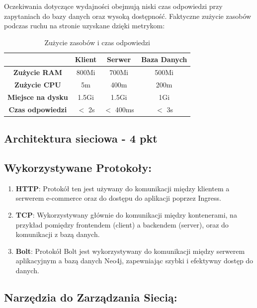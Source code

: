 \documentclass[12pt,a4paper]{article}
\begin{document}
Oczekiwania dotyczące wydajności obejmują niski czas odpowiedzi przy zapytaniach do bazy danych oraz wysoką dostępność. Faktyczne zużycie zasobów podczas ruchu na stronie uzyskane dzięki metrykom:
\begin{table}[h!]
\centering
\begin{tabular}{|c|c|c|c|}
\hline
 & \textbf{Klient} & \textbf{Serwer} & \textbf{Baza Danych} \\ \hline
\textbf{Zużycie RAM} & 800Mi & 700Mi & 500Mi \\ \hline
\textbf{Zużycie CPU} & 5m & 400m & 200m \\ \hline
\textbf{Miejsce na dysku} & 1.5Gi & 1.5Gi & 1Gi \\ \hline
\textbf{Czas odpowiedzi} & $<$ 2s & $<$ 400ms & $<$ 3s \\ \hline
\end{tabular}
\caption{Zużycie zasobów i czas odpowiedzi}
\label{table:zuzycie}
\end{table}


\subsection{Architektura sieciowa - 4 pkt}
\subsection*{Wykorzystywane Protokoły:}

\begin{enumerate}
    \item \textbf{HTTP}: Protokół ten jest używany do komunikacji między klientem a serwerem e-commerce oraz do dostępu do aplikacji poprzez Ingress.
    
    \item \textbf{TCP}: Wykorzystywany głównie do komunikacji między kontenerami, na przykład pomiędzy frontendem (client) a backendem (server), oraz do komunikacji z bazą danych.
    
    \item \textbf{Bolt}: Protokół Bolt jest wykorzystywany do komunikacji między serwerem aplikacyjnym a bazą danych Neo4j, zapewniając szybki i efektywny dostęp do danych.
\end{enumerate}

\subsection*{Narzędzia do Zarządzania Siecią:}
\end{document}
